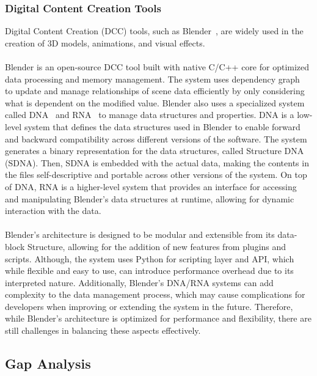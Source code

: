\subsubsection*{Digital Content Creation Tools}

Digital Content Creation (DCC) tools, such as Blender~\cite{Blender}, are widely used in the creation 
of 3D models, animations, and visual effects.
\\\\
Blender is an open-source DCC tool built with native C/C++ core for optimized data processing and 
memory management.
The system uses dependency graph~\cite{Blender_Dependency} to update and manage relationships of scene data 
efficiently by only considering what is dependent on the modified value.
Blender also uses a specialized system called DNA~\cite{Blender_DNA} and RNA~\cite{Blender_RNA} to manage 
data structures and properties.
DNA is a low-level system that defines the data structures used in Blender to enable forward and backward 
compatibility across different versions of the software.
The system generates a binary representation for the data structures, called Structure DNA (SDNA).
Then, SDNA is embedded with the actual data, making the contents in the files self-descriptive and portable 
across other versions of the system.
On top of DNA, RNA is a higher-level system that provides an interface for accessing and manipulating 
Blender's data structures at runtime, allowing for dynamic interaction with the data.
\\\\
Blender's architecture is designed to be modular and extensible from its data-block Structure, allowing for 
the addition of new features from plugins and scripts.
Although, the system uses Python for scripting layer and API, which while flexible and easy to use, 
can introduce performance overhead due to its interpreted nature.
Additionally, Blender's DNA/RNA systems can add complexity to the data management process, which may cause 
complications for developers when improving or extending the system in the future.
Therefore, while Blender's architecture is optimized for performance and flexibility, there are still 
challenges in balancing these aspects effectively.

\subsection{Gap Analysis}
\label{subsec:gap-analysis}

